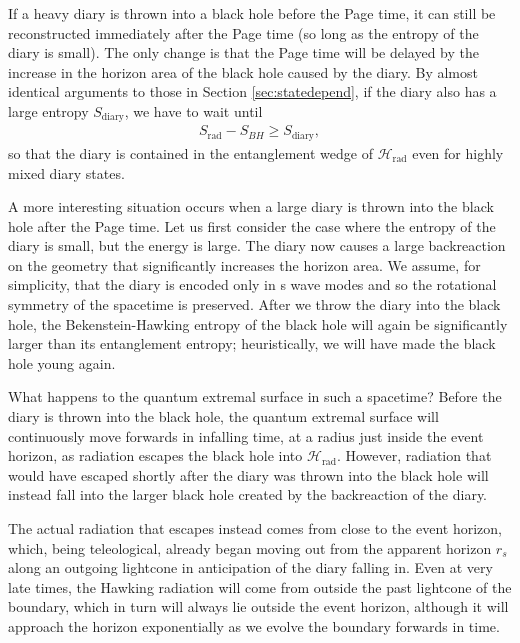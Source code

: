 \documentclass[12pt]{article}
\newcommand{\Srad}{S_\text{rad} }
\begin{document}
If a heavy diary is thrown into a black hole before the Page time, it can still be reconstructed immediately after the Page time (so long as the entropy of the diary is small). The only change is that the Page time will be delayed by the increase in the horizon area of the black hole caused by the diary. By almost identical arguments to those in Section \ref{sec:statedepend}, if the diary also has a large entropy $S_\text{diary}$, we have to wait until
\begin{align}
\Srad - S_{BH} \geq S_\text{diary},
\end{align}
 so that the diary is contained in the entanglement wedge of $\mathcal{H}_\text{rad}$ even for highly mixed diary states. 

A more interesting situation occurs when a large diary is thrown into the black hole after the Page time. Let us first consider the case where the entropy of the diary is small, but the energy is large. The diary now causes a large backreaction on the geometry that significantly increases the horizon area. We assume, for simplicity, that the diary is encoded only in s wave modes and so the rotational symmetry of the spacetime is preserved. After we throw the diary into the black hole, the Bekenstein-Hawking entropy of the black hole will again be significantly larger than its entanglement entropy; heuristically, we will have made the black hole young again.

What happens to the quantum extremal surface in such a spacetime? Before the diary is thrown into the black hole, the quantum extremal surface will continuously move forwards in infalling time, at a radius just inside the event horizon, as radiation escapes the black hole into $\mathcal{H}_\text{rad}$. However, radiation that would have escaped shortly after the diary was thrown into the black hole will instead fall into the larger black hole created by the backreaction of the diary.

The actual radiation that escapes instead comes from close to the event horizon, which, being teleological, already began moving out from the apparent horizon $r_s$ along an outgoing lightcone in anticipation of the diary falling in. Even at very late times, the Hawking radiation will come from outside the past lightcone of the boundary, which in turn will always lie outside the event horizon, although it will approach the horizon exponentially as we evolve the boundary forwards in time. 
\end{document}
